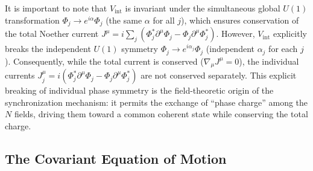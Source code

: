 It is important to note that $V_{\text{int}}$ is invariant under the simultaneous global $U(1)$ transformation $\Phi_j \to e^{i\alpha}\Phi_j$ (the same $\alpha$ for all $j$), which ensures conservation of the total Noether current $J^\mu = i\sum_j(\Phi_j^*\partial^\mu\Phi_j - \Phi_j\partial^\mu\Phi_j^*)$.
However, $V_{\text{int}}$ explicitly breaks the independent $U(1)$ symmetry $\Phi_j \to e^{i\alpha_j}\Phi_j$ (independent $\alpha_j$ for each $j$).
Consequently, while the total current is conserved ($\nabla_\mu J^\mu = 0$), the individual currents $J_j^\mu = i(\Phi_j^*\partial^\mu\Phi_j - \Phi_j\partial^\mu\Phi_j^*)$ are not conserved separately.
This explicit breaking of individual phase symmetry is the field-theoretic origin of the synchronization mechanism: it permits the exchange of ``phase charge'' among the $N$ fields, driving them toward a common coherent state while conserving the total charge.

\subsection{The Covariant Equation of Motion}
\label{subsec:eom}

